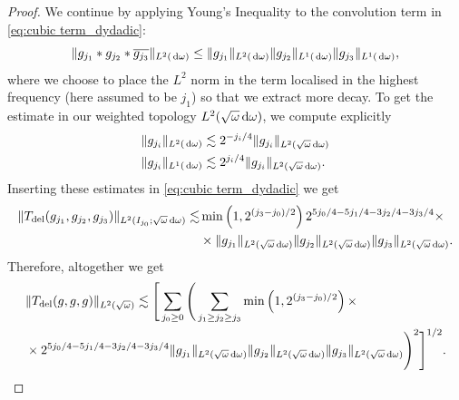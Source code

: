 \documentclass[reqno,11pt,letterpaper]{amsart}
\numberwithin{equation}{section}
\newcommand{\dd}{\, {\rm d}}
\begin{document}
\begin{proof}
        We continue by applying Young's Inequality to the convolution term in \eqref{eq:cubic term_dydadic}: 
        \begin{equation}\label{eq:Young_Ineq_convolution}
         \| g_{j_1} \ast g_{j_2} \ast \overline{g_{j_3}} \|_{L^2(\dd \omega)} \leq \|g_{j_1} \|_{L^2(\dd \omega)} \|g_{j_2} \|_{L^1(\dd \omega)} \| g_{j_3} \|_{L^1(\dd \omega)}, 
         \end{equation}
        where we choose to place the $L^2$ norm in the term localised in the highest frequency (here assumed to be $j_1$) so that we extract more decay. To get the estimate in our weighted topology $L^2(\sqrt{\omega}\dd \omega)$, we compute explicitly 
        \begin{align} \label{eq:estimL2_1}
            & \|g_{j_i}\|_{L^2(\dd \omega)} \lesssim 2^{-j_i/4} \|g_{j_i}\|_{L^2(\sqrt{\omega}\dd\omega)}\\
            \label{eq:estimL2_2}
            & \|g_{j_i}\|_{L^1(\dd \omega)} \lesssim 
            2^{j_i/4} \|g_{j_i}\|_{L^2(\sqrt{\omega}\dd\omega)}.
        \end{align}
        Inserting these estimates in \eqref{eq:cubic term_dydadic} we get  
        \begin{equation}
            \begin{split}
                 \|T_{\text{del}}(g_{j_1},g_{j_2},g_{j_3})  \|_{L^2(I_{j_0};\sqrt{\omega}\dd \omega)}  
                 \lesssim  
                &\min \left(1, 2^{(j_3-j_0)/2} \right) 2^{5 j_0/4 - 5j_1/4 - 3j_2/4 - 3j_3/4} \times  \\ &\times \|g_{j_1}\|_{L^2(\sqrt{\omega}\dd\omega)}
                \| g_{j_2}\|_{L^2(\sqrt{\omega}\dd\omega)}
                \| g_{j_3}\|_{L^2(\sqrt{\omega}\dd\omega)}.
            \end{split}
        \end{equation}
        Therefore, altogether we get 
        \begin{equation}
            \begin{split}
                        &\|T_{\text{del}}(g,g,g)\|_{L^2(\sqrt{\omega})} 
                        \lesssim  
                       \Bigg[ \sum_{j_0\geq 0}
                       \Bigg( \sum_{j_1\geq j_2 \geq j_3}   
                       \min \left(1, 2^{(j_3-j_0)/2} \right) \times \\ 
                       &  \times 
                    2^{5 j_0/4 - 5j_1/4 - 3j_2/4 - 3j_3/4}\|g_{j_1}\|_{L^2(\sqrt{\omega}\dd\omega)}
                \|g_{j_2}\|_{L^2(\sqrt{\omega}\dd\omega)}
                \| g_{j_3}\|_{L^2(\sqrt{\omega}\dd\omega)} \Bigg)^2 \Bigg]^{1/2}.
            \end{split}
        \end{equation}
        

\end{proof}
\end{document}
